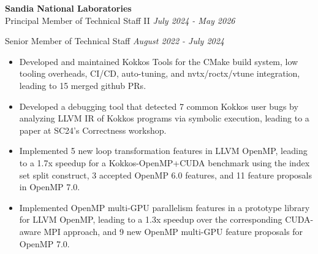 \textbf{Sandia National Laboratories}\\
{Principal Member of Technical Staff II} \hfill \textit{July 2024 - May 2026}
\noindent
\begin{itemize}[itemsep=-0.1em]\onlyitems[include={1,2}]
\myExpTwo
\end{itemize}


\newcommand{\myExpThree}{
\item Developed and maintained Kokkos Tools for the CMake build system, low tooling overheads, CI/CD, auto-tuning, and nvtx/roctx/vtune integration, leading to 15 merged github PRs.
\item Developed a debugging tool that detected 7 common Kokkos user bugs by analyzing LLVM IR of Kokkos programs via symbolic execution, leading to a paper at SC24's Correctness workshop.
\item Implemented 5 new loop transformation features in LLVM OpenMP, leading to a 1.7x speedup for a Kokkos-OpenMP+CUDA benchmark using the index set split construct, 3 accepted OpenMP 6.0 features, and 11 feature proposals in OpenMP 7.0.
\item Implemented OpenMP multi-GPU parallelism features  in a prototype library for LLVM OpenMP, leading to a 1.3x speedup over the corresponding CUDA-aware MPI approach, and 9 new OpenMP multi-GPU feature proposals for OpenMP 7.0.
}

\noindent
{Senior Member of Technical Staff} \hfill \textit{August 2022 - July 2024}
\begin{itemize}[itemsep=-0.1em]
\myExpThree
\end{itemize}

